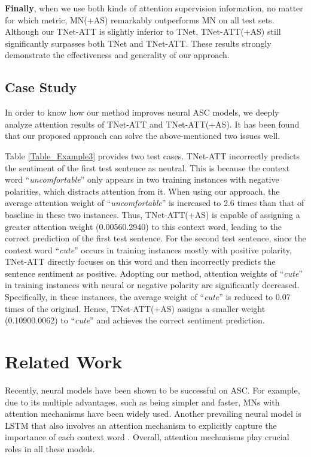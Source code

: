 \documentclass[11pt,a4paper]{article}
\begin{document}
\textbf{Finally},
when we use both kinds of attention supervision information,
no matter for which metric,
MN(+AS) remarkably outperforms MN on all test sets.
Although our TNet-ATT is slightly inferior to TNet,
TNet-ATT(+AS) still significantly surpasses both TNet and TNet-ATT.
These results strongly demonstrate the effectiveness and generality of our approach.


\subsection{Case Study}

In order to know how our method improves neural ASC models,
we deeply analyze attention results of TNet-ATT and TNet-ATT(+AS).
It has been found that our proposed approach can solve the above-mentioned two issues well.

Table \ref{Table_Example3} provides two test cases.
TNet-ATT incorrectly predicts the sentiment of the first test sentence as neutral.
This is because the context word ``\emph{uncomfortable}'' only appears in two training instances with negative polarities,
which distracts attention from it.
When using our approach,
the average attention weight of ``\emph{uncomfortable}'' is increased to 2.6 times than that of baseline in these two instances.
Thus,
TNet-ATT(+AS) is capable of assigning a greater attention weight (0.00560.2940) to this context word,
leading to the correct prediction of the first test sentence.
For the second test sentence,
since the context word ``\emph{cute}'' occurs in training instances mostly with positive polarity,
TNet-ATT directly focuses on this word and then incorrectly predicts the sentence sentiment as positive.
Adopting our method,
attention weights of ``\emph{cute}'' in training instances with neural or negative polarity are significantly decreased.
Specifically, in these instances,
the average weight of ``\emph{cute}'' is reduced to 0.07 times of the original.
Hence,
TNet-ATT(+AS) assigns a smaller weight (0.10900.0062) to ``\emph{cute}'' and achieves the correct sentiment prediction.


\section{Related Work}
Recently,
neural models have been shown to be successful on ASC.
For example,
due to its multiple advantages,
such as being simpler and faster,
MNs with attention mechanisms \cite{Tang:EMNLP2016,Wang:ACL2018} have been widely used.
Another prevailing neural model is LSTM that also involves an attention mechanism to explicitly capture the importance of each context word \cite{Wang:EMNLP2016}.
Overall,
attention mechanisms play crucial roles in all these models.
\end{document}
